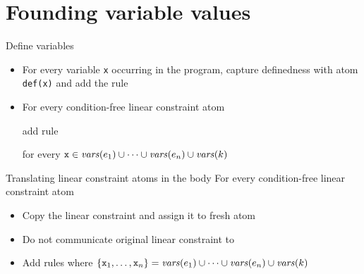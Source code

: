 \documentclass[11pt]{beamer}
\begin{document}
\section{Founding variable values}

\begin{frame}{Define variables}
  \begin{itemize}
    \item For every variable \texttt{x} occurring in the program, capture definedness with atom \texttt{def(x)} and add the rule

    \pause
    \item For every condition-free linear constraint atom 
    
       add rule
       
       for every $\mathtt{x} \in \mathit{vars}(e_1)\cup\dots\cup\mathit{vars}(e_n)\cup\mathit{vars}(k)$
   \end{itemize}
\end{frame}

\begin{frame}{Translating linear constraint atoms in the body}
  For every condition-free linear constraint atom 
     
    \pause
    \begin{itemize}
      \item Copy the linear constraint and assign it to fresh atom
           \pause
      \item Do not communicate original linear constraint to \clingcon\ \pause 
      \item Add rules
      \only<4>{}
      where $\{\mathtt{x}_1,\dots,\mathtt{x}_n\}=\mathit{vars}(e_1)\cup\dots\cup\mathit{vars}(e_n)\cup\mathit{vars}(k)$
    \end{itemize}
\end{frame}
\end{document}
